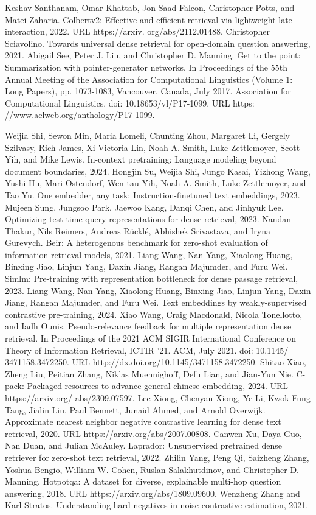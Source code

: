 Keshav Santhanam, Omar Khattab, Jon Saad-Falcon, Christopher Potts, and Matei Zaharia. Colbertv2: Effective and efficient retrieval via lightweight late interaction, 2022. URL https://arxiv. org/abs/2112.01488.
Christopher Sciavolino. Towards universal dense retrieval for open-domain question answering, 2021.
Abigail See, Peter J. Liu, and Christopher D. Manning. Get to the point: Summarization with pointer-generator networks. In Proceedings of the 55th Annual Meeting of the Association for Computational Linguistics (Volume 1: Long Papers), pp. 1073-1083, Vancouver, Canada, July 2017. Association for Computational Linguistics. doi: 10.18653/vl/P17-1099. URL https: //www.aclweb.org/anthology/P17-1099.

Weijia Shi, Sewon Min, Maria Lomeli, Chunting Zhou, Margaret Li, Gergely Szilvasy, Rich James, Xi Victoria Lin, Noah A. Smith, Luke Zettlemoyer, Scott Yih, and Mike Lewis. In-context pretraining: Language modeling beyond document boundaries, 2024.
Hongjin Su, Weijia Shi, Jungo Kasai, Yizhong Wang, Yushi Hu, Mari Ostendorf, Wen tau Yih, Noah A. Smith, Luke Zettlemoyer, and Tao Yu. One embedder, any task: Instruction-finetuned text embeddings, 2023.
Mujeen Sung, Jungsoo Park, Jaewoo Kang, Danqi Chen, and Jinhyuk Lee. Optimizing test-time query representations for dense retrieval, 2023.
Nandan Thakur, Nils Reimers, Andreas Rücklé, Abhishek Srivastava, and Iryna Gurevych. Beir: A heterogenous benchmark for zero-shot evaluation of information retrieval models, 2021.
Liang Wang, Nan Yang, Xiaolong Huang, Binxing Jiao, Linjun Yang, Daxin Jiang, Rangan Majumder, and Furu Wei. Simlm: Pre-training with representation bottleneck for dense passage retrieval, 2023.
Liang Wang, Nan Yang, Xiaolong Huang, Binxing Jiao, Linjun Yang, Daxin Jiang, Rangan Majumder, and Furu Wei. Text embeddings by weakly-supervised contrastive pre-training, 2024.
Xiao Wang, Craig Macdonald, Nicola Tonellotto, and Iadh Ounis. Pseudo-relevance feedback for multiple representation dense retrieval. In Proceedings of the 2021 ACM SIGIR International Conference on Theory of Information Retrieval, ICTIR '21. ACM, July 2021. doi: 10.1145/ 3471158.3472250. URL http://dx.doi.org/10.1145/3471158.3472250.
Shitao Xiao, Zheng Liu, Peitian Zhang, Niklas Muennighoff, Defu Lian, and Jian-Yun Nie. C-pack: Packaged resources to advance general chinese embedding, 2024. URL https://arxiv.org/ abs/2309.07597.
Lee Xiong, Chenyan Xiong, Ye Li, Kwok-Fung Tang, Jialin Liu, Paul Bennett, Junaid Ahmed, and Arnold Overwijk. Approximate nearest neighbor negative contrastive learning for dense text retrieval, 2020. URL https://arxiv.org/abs/2007.00808.
Canwen Xu, Daya Guo, Nan Duan, and Julian McAuley. Laprador: Unsupervised pretrained dense retriever for zero-shot text retrieval, 2022.
Zhilin Yang, Peng Qi, Saizheng Zhang, Yoshua Bengio, William W. Cohen, Ruslan Salakhutdinov, and Christopher D. Manning. Hotpotqa: A dataset for diverse, explainable multi-hop question answering, 2018. URL https://arxiv.org/abs/1809.09600.
Wenzheng Zhang and Karl Stratos. Understanding hard negatives in noise contrastive estimation, 2021.


